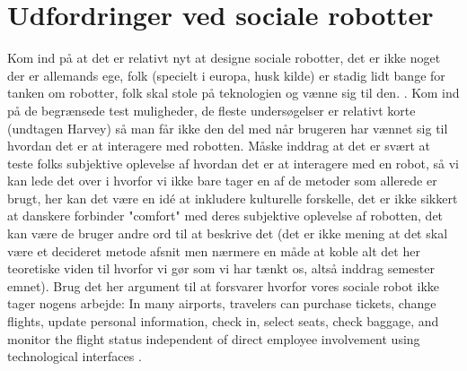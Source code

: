 \section{Udfordringer ved sociale robotter}
\label{UdfordringerSocialeRobotter}
%

Kom ind på at det er relativt nyt at designe sociale robotter, det er ikke noget der er allemands ege, folk (specielt i europa, husk kilde) er stadig lidt bange for tanken om robotter, folk skal stole på teknologien og vænne sig til den. . Kom ind på de begrænsede test muligheder, de fleste undersøgelser er relativt korte (undtagen Harvey) så man får ikke den del med når brugeren har vænnet sig til hvordan det er at interagere med robotten.  \blankline
%
Måske inddrag at det er svært at teste folks subjektive oplevelse af hvordan det er at interagere med en robot, så vi kan lede det over i hvorfor vi ikke bare tager en af de metoder som allerede er brugt, her kan det være en idé at inkludere kulturelle forskelle, det er ikke sikkert at danskere forbinder "comfort" med deres subjektive oplevelse af robotten, det kan være de bruger andre ord til at beskrive det (det er ikke mening at det skal være et decideret metode afsnit men nærmere en måde at koble alt det her teoretiske viden til hvorfor vi gør som vi har tænkt os, altså inddrag semester emnet).\blankline
%
Brug det her argument til at forsvarer hvorfor vores sociale robot ikke tager nogens arbejde: In many airports, travelers can purchase tickets, change flights, update personal information, check in, select seats, check baggage, and monitor the flight status independent of direct employee involvement using technological interfaces \textcite[s. 352]{PDF:TheImpactOfTraveler}.

